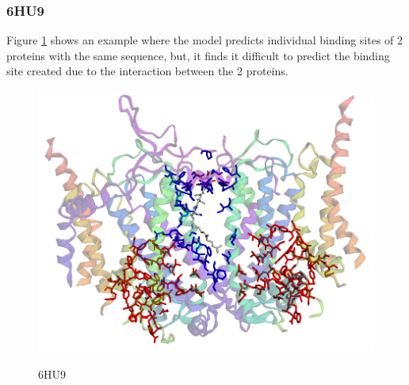 \documentclass[journal=jacsat,manuscript=article]{achemso}
\begin{document}
\newpage
\subsubsection{6HU9}
\quad Figure \ref{fig:6hu9} shows an example where the model predicts individual binding sites of 2 proteins with the same sequence, but, it finds it difficult to predict the binding site created due to the interaction between the 2 proteins.
\begin{figure}
    \caption{\centering 6HU9}
    \centering
    \noindent\includegraphics[scale=0.35]{6hu9.png}
    \label{fig:6hu9}
\end{figure}
\end{document}
